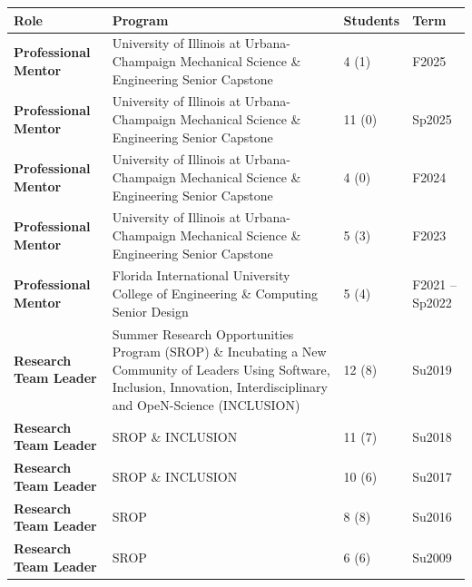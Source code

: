\documentclass{article}[12pt]
\begin{document}
	\begin{tabularx}{\textwidth}{lXll}
		Role & Program & Students & Term \\
		\midrule
		\textbf{Professional Mentor} & University of Illinois at Urbana-Champaign Mechanical Science \& Engineering Senior Capstone & 4 (1) & F2025 \\
		\textbf{Professional Mentor} & University of Illinois at Urbana-Champaign Mechanical Science \& Engineering Senior Capstone & 11 (0) & Sp2025 \\
		\textbf{Professional Mentor} & University of Illinois at Urbana-Champaign Mechanical Science \& Engineering Senior Capstone & 4 (0) & F2024 \\
		\textbf{Professional Mentor} & University of Illinois at Urbana-Champaign Mechanical Science \& Engineering Senior Capstone & 5 (3) & F2023 \\
		\textbf{Professional Mentor} & Florida International University College of \newline Engineering \& Computing Senior Design & 5 (4) & F2021 -- Sp2022 \\
		\textbf{Research Team Leader} & Summer Research Opportunities Program (SROP) \& Incubating a New Community of Leaders Using Software, Inclusion, Innovation, Interdisciplinary and OpeN-Science (INCLUSION) & 12 (8) & Su2019 \\
		\textbf{Research Team Leader} & SROP \& INCLUSION & 11 (7) & Su2018 \\
		\textbf{Research Team Leader} & SROP \& INCLUSION & 10 (6) & Su2017 \\
		\textbf{Research Team Leader} & SROP  & 8 (8) & Su2016  \\
		\textbf{Research Team Leader} & SROP  & 6 (6) & Su2009   \\
	\end{tabularx}
	
	\addtocounter{total_trainees}{4} %
	\addtocounter{total_trainees}{11} %
	\addtocounter{total_trainees}{4} %
	\addtocounter{total_trainees}{5} %
	\addtocounter{total_trainees}{5} %
	\addtocounter{total_trainees}{12} %
	\addtocounter{total_trainees}{11} %
	\addtocounter{total_trainees}{10} %
	\addtocounter{total_trainees}{8} %
	\addtocounter{total_trainees}{6} %
	
\end{document}
